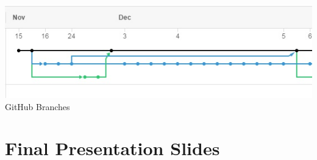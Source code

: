 \documentclass[a4paper]{report}
\begin{document}
\section{}
\pagebreak
\section{}
\pagebreak
\section{}
\subsection{}
\includegraphics[width=1.0\linewidth]{./appendixImages/GitHubScreenShot01}
GitHub Branches
\pagebreak
\section{}
\pagebreak
\section{Final Presentation Slides}

\end{document}
